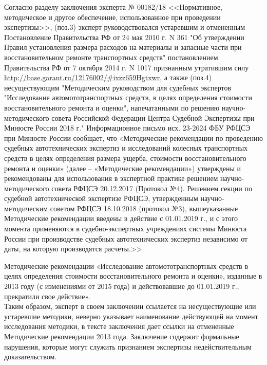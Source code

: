 \par Согласно  разделу заключения эксперта № 00182/18 <<Нормативное, методическое и другое обеспечение, использованное при проведении экспертизы>>, (поз.3) эксперт руководствовался устаревшим  и отмененным Постановление Правительства РФ от 24 мая 2010 г. N 361 "Об утверждении Правил установления размера расходов на материалы и запасные части при восстановительном ремонте транспортных средств" постановлением Правительства РФ от 7 октября 2014 г. N 1017  признанным утратившим силу
\url{ http://base.garant.ru/12176002/#ixzz659Hgtxwr}, а также (поз.4) несуществующим  "Методическим руководством для судебных экспертов "Исследование автомототранспортных средств, в целях определения стоимости   восстановительного ремонта и оценки", напечатанными по решению научно-методи\-ческого совета Российской Федерации Центра Судебной Экспертизы при Минюсте России 2018 г."  Информационное письмо исх. 23-2624 ФБУ РФЦСЭ при Минюсте России сообщает, что «Методические рекомендации по проведению судебных автотехнических экспертиз и исследований колесных транспортных средств в целях определения размера ущерба, стоимости восстановительного ремонта и оценки» (далее – «Методические рекомендации») утверждены и рекомендованы для использования в экспертной практике решением научно-методи\-ческого совета РФЦСЭ 20.12.2017 (Протокол №4). Решением секции по судебной автотехнической экспертизе РФЦСЭ, утвержденным научно-методическим советом РФЦСЭ 18.10.2018 (протокол №3), вышеуказанные Методические рекомендации введены в действие с 01.01.2019 г., и с этого момента применяются в судебно-экспертных учреждениях системы Минюста России при производстве судебных автотехнических экспертиз независимо от даты, на которую производятся расчеты.>> 

Методические рекомендации «Исследование автомототранспортных средств в целях определения стоимости восстановительного ремонта и оценки», изданные в 2013 году (с изменениями от 2015 года) и действовавшие до 01.01.2019 г., прекратили свое действие».\\

Таким образом, эксперт в своем заключении ссылается на несуществующие или устаревшие методики, неверно указывает наименование действующей на момент исследования методики, в тексте заключения дает ссылки на отмененные Методические рекомендации 2013 года.  Заключение  содержит формальные нарушения, которые могут  служить  признанием экспертизы недействительным доказательством.




